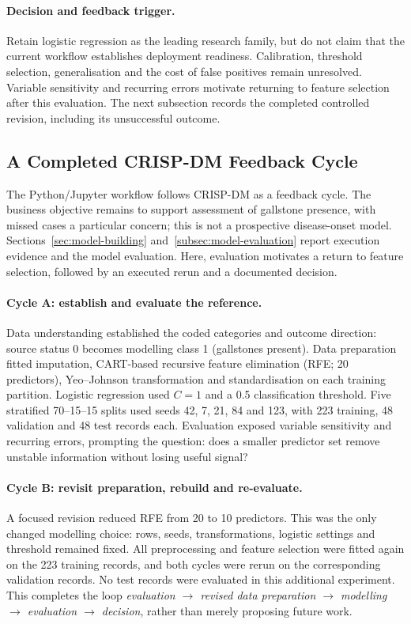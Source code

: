 \paragraph{Decision and feedback trigger.}
Retain logistic regression as the leading research family, but do not claim
that the current workflow establishes deployment readiness. Calibration,
threshold selection, generalisation and the cost of false positives remain
unresolved. Variable sensitivity and recurring errors motivate returning to
feature selection after this evaluation. The next subsection records the
completed controlled revision, including its unsuccessful outcome.
\subsection{A Completed CRISP-DM Feedback Cycle}
\label{subsec:iterations}

The Python/Jupyter workflow follows CRISP-DM as a feedback cycle. The business objective remains to support assessment of gallstone presence, with missed cases a particular concern; this is not a prospective disease-onset model. Sections~\ref{sec:model-building} and~\ref{subsec:model-evaluation} report execution evidence and the model evaluation. Here, evaluation motivates a return to feature selection, followed by an executed rerun and a documented decision.

\paragraph{Cycle A: establish and evaluate the reference.}
Data understanding established the coded categories and outcome direction: source status 0 becomes modelling class 1 (gallstones present). Data preparation fitted imputation, CART-based recursive feature elimination (RFE; 20 predictors), Yeo--Johnson transformation and standardisation on each training partition. Logistic regression used $C=1$ and a 0.5 classification threshold. Five stratified 70--15--15 splits used seeds 42, 7, 21, 84 and 123, with 223 training, 48 validation and 48 test records each. Evaluation exposed variable sensitivity and recurring errors, prompting the question: does a smaller predictor set remove unstable information without losing useful signal?

\paragraph{Cycle B: revisit preparation, rebuild and re-evaluate.}
A focused revision reduced RFE from 20 to 10 predictors. This was the only changed modelling choice: rows, seeds, transformations, logistic settings and threshold remained fixed. All preprocessing and feature selection were fitted again on the 223 training records, and both cycles were rerun on the corresponding validation records. No test records were evaluated in this additional experiment. This completes the loop
\emph{evaluation $\rightarrow$ revised data preparation $\rightarrow$ modelling $\rightarrow$ evaluation $\rightarrow$ decision}, rather than merely proposing future work.

